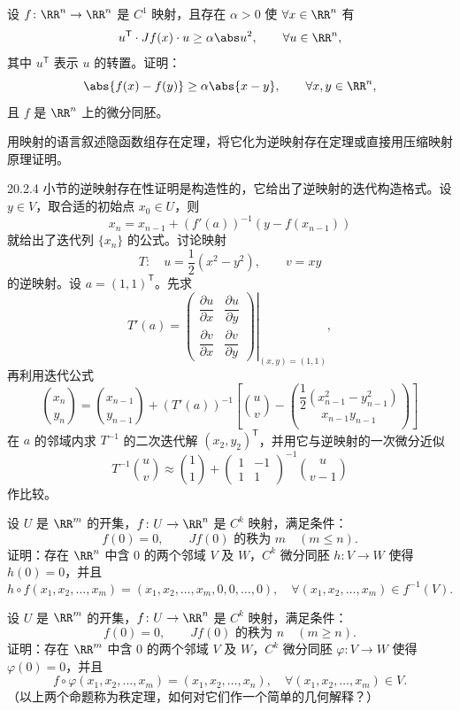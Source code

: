 \begin{xreferenceproblem}[2]
设 $f\colon\RR^n\to\RR^n$ 是 $C^1$ 映射，且存在 $\alpha>0$ 使 $\forall x\in\RR^n$ 有
  \[
    u^{\mathsf T}\cdot Jf(x)\cdot u\ge\alpha\abs u^2,\qquad \forall u\in\RR^n,
  \]
  其中 $u^{\mathsf T}$ 表示 $u$ 的转置。证明：
  \[
    \abs{f(x)-f(y)}\ge\alpha\abs{x-y},\qquad \forall x,y\in\RR^n,
  \]
  且 $f$ 是 $\RR^n$ 上的微分同胚。
\end{xreferenceproblem}

\begin{xreferenceproblem}[3]
用映射的语言叙述隐函数组存在定理，将它化为逆映射存在定理或直接用压缩映射原理证明。
\end{xreferenceproblem}

\begin{xreferenceproblem}[4]
20.2.4 小节的逆映射存在性证明是构造性的，它给出了逆映射的迭代构造格式。设 $y\in V$，取合适的初始点 $x_0\in U$，则
  \[
    x_n=x_{n-1}+(f'(a))^{-1}(y-f(x_{n-1}))
  \]
  就给出了迭代列 $\{x_n\}$ 的公式。讨论映射
  \[
    T:\quad u=\frac12(x^2-y^2),\qquad v=xy
  \]
  的逆映射。设 $a=(1,1)^{\mathsf T}$。先求
  \[
    T'(a)=\left.\begin{pmatrix}
      \dfrac{\partial u}{\partial x}&\dfrac{\partial u}{\partial y}\\[4pt]
      \dfrac{\partial v}{\partial x}&\dfrac{\partial v}{\partial y}
    \end{pmatrix}\right|_{(x,y)=(1,1)},
  \]
  再利用迭代公式
  \[
    \binom{x_n}{y_n}=\binom{x_{n-1}}{y_{n-1}}
    +(T'(a))^{-1}\left[
      \binom uv-
      \binom{\dfrac12(x_{n-1}^2-y_{n-1}^2)}{x_{n-1}y_{n-1}}
    \right]
  \]
  在 $a$ 的邻域内求 $T^{-1}$ 的二次迭代解 $(x_2,y_2)^{\mathsf T}$，并用它与逆映射的一次微分近似
  \[
    T^{-1}\binom uv\approx
    \binom11+\begin{pmatrix}1&-1\\1&1\end{pmatrix}^{-1}
    \binom u{v-1}
  \]
  作比较。
\end{xreferenceproblem}

\begin{xreferenceproblem}[5]
设 $U$ 是 $\RR^m$ 的开集，$f\colon U\to\RR^n$ 是 $C^k$ 映射，满足条件：
  \[
    f(0)=0,\qquad Jf(0)\text{ 的秩为 }m\quad(m\le n).
  \]
  证明：存在 $\RR^n$ 中含 0 的两个邻域 $V$ 及 $W$，$C^k$ 微分同胚 $h\colon V\to W$ 使得 $h(0)=0$，并且
  \[
    h\circ f(x_1,x_2,\ldots,x_m)
    =(x_1,x_2,\ldots,x_m,0,0,\ldots,0),
    \quad \forall(x_1,x_2,\ldots,x_m)\in f^{-1}(V).
  \]
\end{xreferenceproblem}

\begin{xreferenceproblem}[6]
设 $U$ 是 $\RR^m$ 的开集，$f\colon U\to\RR^n$ 是 $C^k$ 映射，满足条件：
  \[
    f(0)=0,\qquad Jf(0)\text{ 的秩为 }n\quad(m\ge n).
  \]
  证明：存在 $\RR^m$ 中含 0 的两个邻域 $V$ 及 $W$，$C^k$ 微分同胚 $\varphi\colon V\to W$ 使得 $\varphi(0)=0$，并且
  \[
    f\circ\varphi(x_1,x_2,\ldots,x_m)=(x_1,x_2,\ldots,x_n),
    \quad \forall(x_1,x_2,\ldots,x_m)\in V.
  \]
  （以上两个命题称为秩定理，如何对它们作一个简单的几何解释？）
\end{xreferenceproblem}
